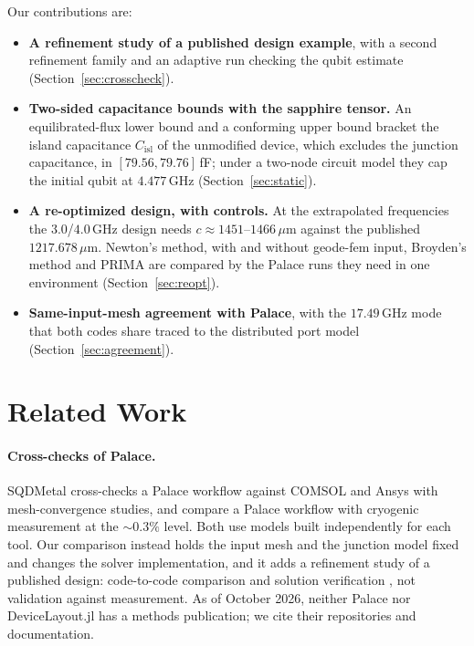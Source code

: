 \documentclass{anvil-paper}
\newcommand{\Cisl}{C_{\mathrm{isl}}}
\begin{document}
Our contributions are:
\begin{itemize}
  \item \textbf{A refinement study of a published design example}, with
    a second refinement family and an adaptive run checking the qubit
    estimate (Section~\ref{sec:crosscheck}).
  \item \textbf{Two-sided capacitance bounds with the sapphire tensor.}
    An equilibrated-flux lower bound and a conforming upper bound bracket
    the island capacitance $\Cisl$ of the unmodified device, which
    excludes the junction capacitance, in $[79.56, 79.76]$\,fF; under a
    two-node circuit model they cap the initial qubit at $4.477$\,GHz
    (Section~\ref{sec:static}).
  \item \textbf{A re-optimized design, with controls.} At the extrapolated
    frequencies the $3.0$/$4.0$\,GHz design needs $c \approx
    1451$--$1466\,\mu$m against the published $1217.678\,\mu$m. Newton's
    method, with and without geode-fem input, Broyden's method and PRIMA
    are compared by the Palace runs they need in one environment
    (Section~\ref{sec:reopt}).
  \item \textbf{Same-input-mesh agreement with Palace}, with the
    $17.49$\,GHz mode that both codes share traced to the distributed port
    model (Section~\ref{sec:agreement}).
\end{itemize}

\section{Related Work}
\label{sec:related}

\paragraph{Cross-checks of Palace.}
SQDMetal \citep{sommers2025open} cross-checks a Palace workflow against
COMSOL and Ansys with mesh-convergence studies, and
\citet{ye2025electromagnetic} compare a Palace workflow with cryogenic
measurement at the ${\sim}0.3\%$ level. Both use models built
independently for each tool. Our comparison instead holds the input mesh
and the junction model fixed and changes the solver implementation, and it
adds a refinement study of a published design: code-to-code comparison and
solution verification \citep{oberkampf2010verification}, not validation
against measurement. As of October 2026, neither Palace nor DeviceLayout.jl has a
methods publication; we cite their repositories and documentation.
\end{document}
